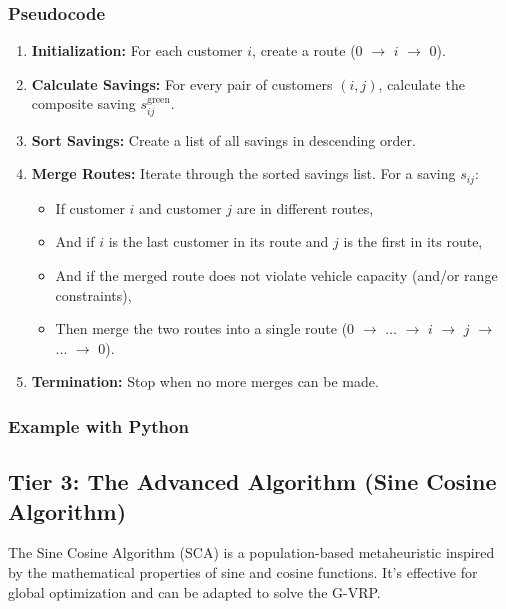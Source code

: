 \documentclass{article}
\begin{document}
\subsubsection{Pseudocode}
\begin{enumerate}
    \item \textbf{Initialization:} For each customer $i$, create a route (0 $\rightarrow$ $i$ $\rightarrow$ 0).
    \item \textbf{Calculate Savings:} For every pair of customers $(i, j)$, calculate the composite saving $s_{ij}^{\text{green}}$.
    \item \textbf{Sort Savings:} Create a list of all savings in descending order.
    \item \textbf{Merge Routes:} Iterate through the sorted savings list. For a saving $s_{ij}$:
        \begin{itemize}
            \item If customer $i$ and customer $j$ are in different routes,
            \item And if $i$ is the last customer in its route and $j$ is the first in its route,
            \item And if the merged route does not violate vehicle capacity (and/or range constraints),
            \item Then merge the two routes into a single route (0 $\rightarrow$ ... $\rightarrow$ $i$ $\rightarrow$ $j$ $\rightarrow$ ... $\rightarrow$ 0).
        \end{itemize}
    \item \textbf{Termination:} Stop when no more merges can be made.
\end{enumerate}

\subsubsection{Example with Python}



\subsection{Tier 3: The Advanced Algorithm (Sine Cosine Algorithm)}
The Sine Cosine Algorithm (SCA) is a population-based metaheuristic inspired by the mathematical properties of sine and cosine functions. It's effective for global optimization and can be adapted to solve the G-VRP.
\end{document}
